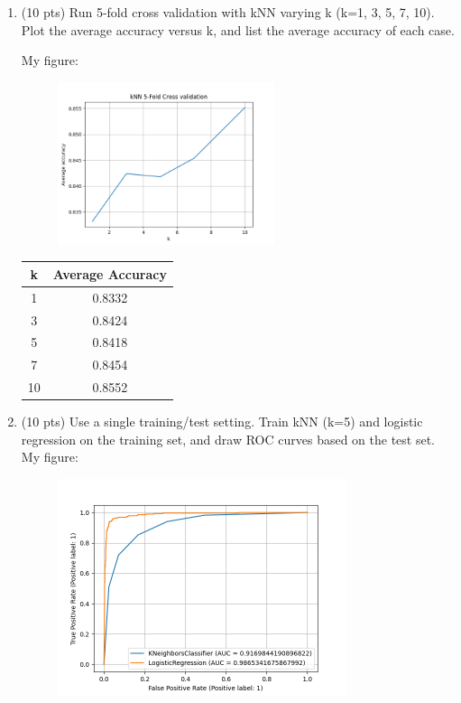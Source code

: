 \documentclass[a4paper]{article}
\theoremstyle{definition}
\newenvironment{soln}{
    \leavevmode\color{blue}\ignorespaces
}{}
\begin{document}
\begin{enumerate}
       \newpage
	\item (10 pts) Run 5-fold cross validation with kNN varying k (k=1, 3, 5, 7, 10). Plot the average accuracy versus k, and list the average accuracy of each case. \\
	\begin{soln} 
        My figure:
        \begin{figure}[h]
		\centering
		\includegraphics[width=0.6\textwidth]{images/knn5fold.png}
	\end{figure}
        \begin{center}
            	\begin{tabular}{| c | c |}
            		\hline
            		  k & Average Accuracy \\
            		\hline 1 & 0.8332\\
            		\hline 3 & 0.8424\\
            		\hline 5 & 0.8418\\
            		\hline 7 & 0.8454\\
            		\hline 10 & 0.8552\\
            		\hline
            	\end{tabular}
            \end{center}
        \end{soln}

        \newpage
	\item (10 pts) Use a single training/test setting. Train kNN (k=5) and logistic regression on the training set, and draw ROC curves based on the test set. \\
 
        \begin{soln} My figure:
        \begin{figure}[h]
		\centering
		\includegraphics[width=0.8\textwidth]{images/knnlogitROC.png}
	\end{figure} 
        \end{soln}
	
\end{enumerate}

\end{document}
